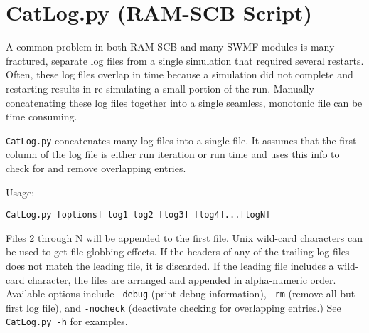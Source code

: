 
\section{CatLog.py (RAM-SCB Script)}
A common problem in both RAM-SCB and many SWMF modules is many fractured, separate log files from a single simulation that required several restarts. Often, these log files overlap in time because a simulation did not complete and restarting results in re-simulating a small portion of the run. Manually concatenating these log files together into a single seamless, monotonic file can be time consuming.

{\tt CatLog.py} concatenates many log files into a single file.  It assumes that the first column of the log file is either run iteration or run time and uses this info to check for and remove overlapping entries.

Usage:
\begin{verbatim}
CatLog.py [options] log1 log2 [log3] [log4]...[logN]
\end{verbatim}

Files 2 through N will be appended to the first file. Unix wild-card characters can be used to get file-globbing effects.  If the headers of any of the trailing log files does not match the leading file, it is discarded. If the leading file includes a wild-card character, the files are arranged and appended in alpha-numeric order. Available options include {\tt -debug} (print debug information), {\tt -rm} (remove all but first log file), and {\tt -nocheck} (deactivate checking for overlapping entries.) See {\tt CatLog.py -h} for examples.